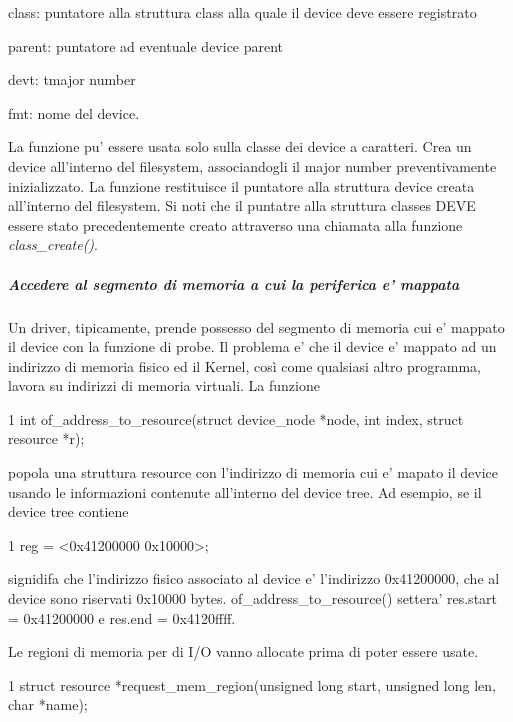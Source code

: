 \begin{DoxyItemize}
\item class\+: puntatore alla struttura class alla quale il device deve essere registrato
\item parent\+: puntatore ad eventuale device parent
\item devt\+: tmajor number
\item fmt\+: nome del device.
\end{DoxyItemize}

La funzione pu' essere usata solo sulla classe dei device a caratteri. Crea un device all'interno del filesystem, associandogli il major number preventivamente inizializzato. La funzione restituisce il puntatore alla struttura device creata all'interno del filesystem. Si noti che il puntatre alla struttura classes D\+E\+V\+E essere stato precedentemente creato attraverso una chiamata alla funzione {\itshape class\+\_\+create()}.

\subparagraph*{Accedere al segmento di memoria a cui la periferica e' mappata}

Un driver, tipicamente, prende possesso del segmento di memoria cui e' mappato il device con la funzione di probe. Il problema e' che il device e' mappato ad un indirizzo di memoria fisico ed il Kernel, così come qualsiasi altro programma, lavora su indirizzi di memoria virtuali. La funzione


\begin{DoxyCode}
1 int of\_address\_to\_resource(struct device\_node *node, int index, struct resource *r);
\end{DoxyCode}


popola una struttura resource con l'indirizzo di memoria cui e' mapato il device usando le informazioni contenute all'interno del device tree. Ad esempio, se il device tree contiene 
\begin{DoxyCode}
1 reg = <0x41200000 0x10000>;
\end{DoxyCode}
 signidifa che l'indirizzo fisico associato al device e' l'indirizzo 0x41200000, che al device sono riservati 0x10000 bytes. of\+\_\+address\+\_\+to\+\_\+resource() settera' res.\+start = 0x41200000 e res.\+end = 0x4120ffff.

Le regioni di memoria per di I/\+O vanno allocate prima di poter essere usate.


\begin{DoxyCode}
1 struct resource *request\_mem\_region(unsigned long start, unsigned long len, char *name);
\end{DoxyCode}



